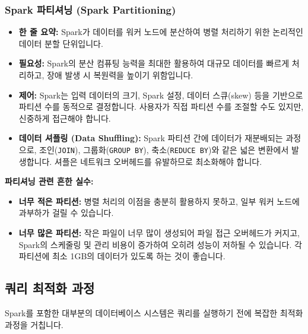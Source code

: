 \documentclass[11pt,a4paper]{article}
\theoremstyle{definition}
\begin{document}
\subsubsection{Spark 파티셔닝 (Spark Partitioning)}
\begin{itemize}
    \item \textbf{한 줄 요약:} Spark가 데이터를 워커 노드에 분산하여 병렬 처리하기 위한 논리적인 데이터 분할 단위입니다.
    \item \textbf{필요성:} Spark의 분산 컴퓨팅 능력을 최대한 활용하여 대규모 데이터를 빠르게 처리하고, 장애 발생 시 복원력을 높이기 위함입니다.
    \item \textbf{제어:} Spark는 입력 데이터의 크기, Spark 설정, 데이터 스큐(skew) 등을 기반으로 파티션 수를 동적으로 결정합니다. 사용자가 직접 파티션 수를 조절할 수도 있지만, 신중하게 접근해야 합니다.
    \item \textbf{데이터 셔플링 (Data Shuffling):} Spark 파티션 간에 데이터가 재분배되는 과정으로, 조인(\texttt{JOIN}), 그룹화(\texttt{GROUP BY}), 축소(\texttt{REDUCE BY})와 같은 넓은 변환에서 발생합니다. 셔플은 네트워크 오버헤드를 유발하므로 최소화해야 합니다.
\end{itemize}

\begin{warningbox}
\textbf{파티셔닝 관련 흔한 실수:}
\begin{itemize}
    \item \textbf{너무 적은 파티션:} 병렬 처리의 이점을 충분히 활용하지 못하고, 일부 워커 노드에 과부하가 걸릴 수 있습니다.
    \item \textbf{너무 많은 파티션:} 작은 파일이 너무 많이 생성되어 파일 접근 오버헤드가 커지고, Spark의 스케줄링 및 관리 비용이 증가하여 오히려 성능이 저하될 수 있습니다. 각 파티션에 최소 1GB의 데이터가 있도록 하는 것이 좋습니다.
\end{itemize}
\end{warningbox}

\subsection{쿼리 최적화 과정}
Spark를 포함한 대부분의 데이터베이스 시스템은 쿼리를 실행하기 전에 복잡한 최적화 과정을 거칩니다.
\end{document}

